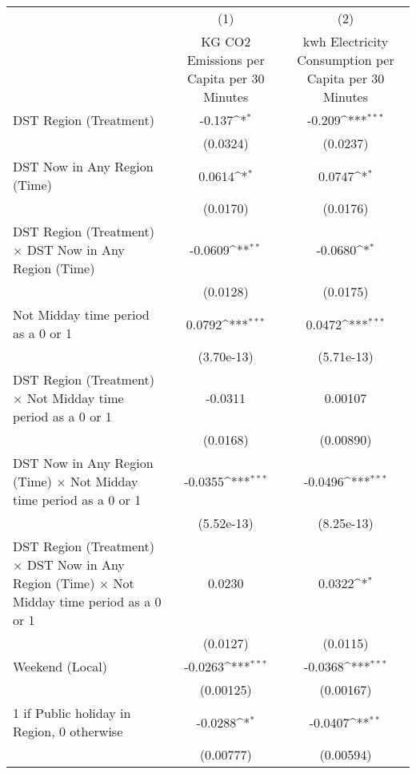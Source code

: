 {
\def\sym#1{\ifmmode^{#1}\else\(^{#1}\)\fi}
\begin{tabular}{l*{2}{c}}
\hline\hline
                    &\multicolumn{1}{c}{(1)}&\multicolumn{1}{c}{(2)}\\
                    &\multicolumn{1}{c}{KG CO2 Emissions per Capita per 30 Minutes}&\multicolumn{1}{c}{kwh Electricity Consumption per Capita per 30 Minutes}\\
\hline
DST Region (Treatment)&      -0.137\sym{*}  &      -0.209\sym{***}\\
                    &    (0.0324)         &    (0.0237)         \\
[1em]
DST Now in Any Region (Time)&      0.0614\sym{*}  &      0.0747\sym{*}  \\
                    &    (0.0170)         &    (0.0176)         \\
[1em]
DST Region (Treatment) $\times$ DST Now in Any Region (Time)&     -0.0609\sym{**} &     -0.0680\sym{*}  \\
                    &    (0.0128)         &    (0.0175)         \\
[1em]
Not Midday time period as a 0 or 1&      0.0792\sym{***}&      0.0472\sym{***}\\
                    &  (3.70e-13)         &  (5.71e-13)         \\
[1em]
DST Region (Treatment) $\times$ Not Midday time period as a 0 or 1&     -0.0311         &     0.00107         \\
                    &    (0.0168)         &   (0.00890)         \\
[1em]
DST Now in Any Region (Time) $\times$ Not Midday time period as a 0 or 1&     -0.0355\sym{***}&     -0.0496\sym{***}\\
                    &  (5.52e-13)         &  (8.25e-13)         \\
[1em]
DST Region (Treatment) $\times$ DST Now in Any Region (Time) $\times$ Not Midday time period as a 0 or 1&      0.0230         &      0.0322\sym{*}  \\
                    &    (0.0127)         &    (0.0115)         \\
[1em]
Weekend (Local)     &     -0.0263\sym{***}&     -0.0368\sym{***}\\
                    &   (0.00125)         &   (0.00167)         \\
[1em]
1 if Public holiday in Region, 0 otherwise&     -0.0288\sym{*}  &     -0.0407\sym{**} \\
                    &   (0.00777)         &   (0.00594)         \\

\end{tabular}}
